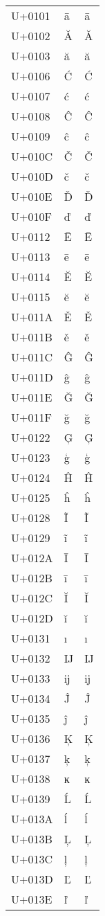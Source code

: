 \documentclass{article}
\begin{document}
\begin{longtable}{lll}
U+0101 & ā & ā \\
U+0102 & Ă & Ă \\
U+0103 & ă & ă \\
U+0106 & Ć & Ć \\
U+0107 & ć & ć \\
U+0108 & Ĉ & Ĉ \\
U+0109 & ĉ & ĉ \\
U+010C & Č & Č \\
U+010D & č & č \\
U+010E & Ď & Ď \\
U+010F & ď & ď \\
U+0112 & Ē & Ē \\
U+0113 & ē & ē \\
U+0114 & Ĕ & Ĕ \\
U+0115 & ĕ & ĕ \\
U+011A & Ě & Ě \\
U+011B & ě & ě \\
U+011C & Ĝ & Ĝ \\
U+011D & ĝ & ĝ \\
U+011E & Ğ & Ğ \\
U+011F & ğ & ğ \\
U+0122 & Ģ & Ģ \\
U+0123 & ģ & ģ \\
U+0124 & Ĥ & Ĥ \\
U+0125 & ĥ & ĥ \\
U+0128 & Ĩ & Ĩ \\
U+0129 & ĩ & ĩ \\
U+012A & Ī & Ī \\
U+012B & ī & ī \\
U+012C & Ĭ & Ĭ \\
U+012D & ĭ & ĭ \\
U+0131 & ı & ı \\
U+0132 & Ĳ & Ĳ \\
U+0133 & ĳ & ĳ \\
U+0134 & Ĵ & Ĵ \\
U+0135 & ĵ & ĵ \\
U+0136 & Ķ & Ķ \\
U+0137 & ķ & ķ \\
U+0138 & ĸ & ĸ \\
U+0139 & Ĺ & Ĺ \\
U+013A & ĺ & ĺ \\
U+013B & Ļ & Ļ \\
U+013C & ļ & ļ \\
U+013D & Ľ & Ľ \\
U+013E & ľ & ľ \\

\end{longtable}
\end{document}
